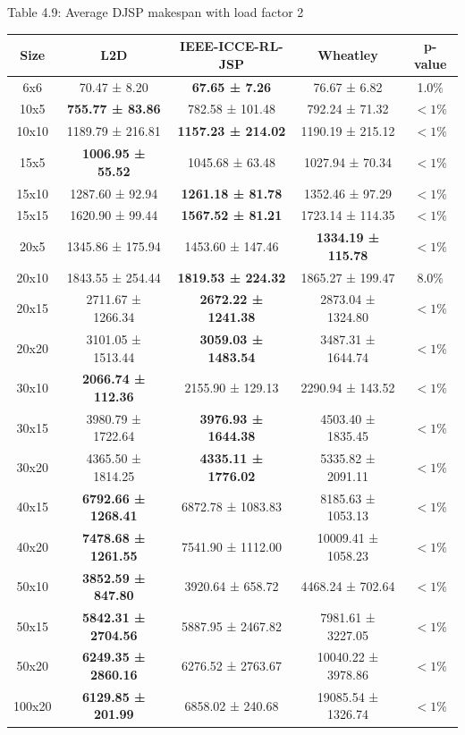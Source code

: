 \begin{table}
    Table 4.9: Average DJSP makespan with load factor 2\\
    \vspace{1mm}
    \label{table:4.7}
    \footnotesize 
    \begin{tabular}{ccccc}
    \toprule
    Size & L2D & IEEE-ICCE-RL-JSP & Wheatley & p-value \\
    \midrule
    6x6 & 70.47 ± 8.20 & \textbf{67.65 ± 7.26} & 76.67 ± 6.82 & 1.0$\%$ \\
    10x5 & \textbf{755.77 ± 83.86} & 782.58 ± 101.48 & 792.24 ± 71.32 & $< 1\%$ \\
    10x10 & 1189.79 ± 216.81 & \textbf{1157.23 ± 214.02} & 1190.19 ± 215.12 & $< 1\%$ \\
    15x5 & \textbf{1006.95 ± 55.52} & 1045.68 ± 63.48 & 1027.94 ± 70.34 & $< 1\%$ \\
    15x10 & 1287.60 ± 92.94 & \textbf{1261.18 ± 81.78} & 1352.46 ± 97.29 & $< 1\%$ \\
    15x15 & 1620.90 ± 99.44 & \textbf{1567.52 ± 81.21} & 1723.14 ± 114.35 & $< 1\%$ \\
    20x5 & 1345.86 ± 175.94 & 1453.60 ± 147.46 & \textbf{1334.19 ± 115.78} & $< 1\%$ \\
    20x10 & 1843.55 ± 254.44 & \textbf{1819.53 ± 224.32} & 1865.27 ± 199.47 & 8.0$\%$ \\
    20x15 & 2711.67 ± 1266.34 & \textbf{2672.22 ± 1241.38} & 2873.04 ± 1324.80 & $< 1\%$ \\
    20x20 & 3101.05 ± 1513.44 & \textbf{3059.03 ± 1483.54} & 3487.31 ± 1644.74 & $< 1\%$ \\
    30x10 & \textbf{2066.74 ± 112.36} & 2155.90 ± 129.13 & 2290.94 ± 143.52 & $< 1\%$ \\
    30x15 & 3980.79 ± 1722.64 & \textbf{3976.93 ± 1644.38} & 4503.40 ± 1835.45 & $< 1\%$ \\
    30x20 & 4365.50 ± 1814.25 & \textbf{4335.11 ± 1776.02} & 5335.82 ± 2091.11 & $< 1\%$ \\
    40x15 & \textbf{6792.66 ± 1268.41} & 6872.78 ± 1083.83 & 8185.63 ± 1053.13 & $< 1\%$ \\
    40x20 & \textbf{7478.68 ± 1261.55} & 7541.90 ± 1112.00 & 10009.41 ± 1058.23 & $< 1\%$ \\
    50x10 & \textbf{3852.59 ± 847.80} & 3920.64 ± 658.72 & 4468.24 ± 702.64 & $< 1\%$ \\
    50x15 & \textbf{5842.31 ± 2704.56} & 5887.95 ± 2467.82 & 7981.61 ± 3227.05 & $< 1\%$ \\
    50x20 & \textbf{6249.35 ± 2860.16} & 6276.52 ± 2763.67 & 10040.22 ± 3978.86 & $< 1\%$ \\
    100x20 & \textbf{6129.85 ± 201.99} & 6858.02 ± 240.68 & 19085.54 ± 1326.74 & $< 1\%$ \\
    \bottomrule
    \end{tabular}
\end{table}
    
